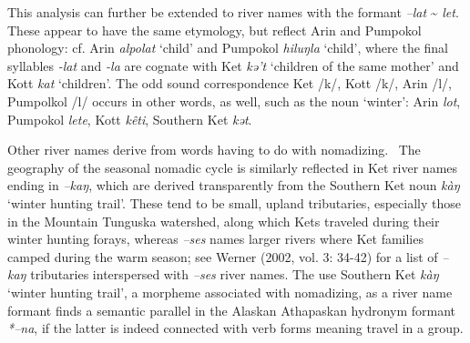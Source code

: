 This analysis can further be extended to river names with the formant \textit{–lat }\~{} \textit{let}. These appear to have the same etymology, but reflect Arin and Pumpokol phonology: cf. Arin \textit{alpolat} ‘child’ and Pumpokol \textit{hiluŋla} ‘child’, where the final syllables \textit{{}-lat} and \textit{{}-la} are cognate with Ket \textit{kə’t} ‘children of the same mother’ and Kott \textit{kat} ‘children’. The odd sound correspondence Ket /k/, Kott /k/, Arin /l/, Pumpolkol /l/ occurs in other words, as well, such as the noun ‘winter’: Arin \textit{lot}, Pumpokol \textit{lete}, Kott \textit{kêti}, Southern Ket \textit{kət}.

Other river names derive from words having to do with nomadizing. \ The geography of the seasonal nomadic cycle is similarly reflected in Ket river names ending in \textit{–kaŋ}, which are derived transparently from the Southern Ket noun \textit{kàŋ }‘winter hunting trail’. These tend to be small, upland tributaries, especially those in the Mountain Tunguska watershed, along which Kets traveled during their winter hunting forays, whereas \textit{–ses} names larger rivers where Ket families camped during the warm season; see Werner (2002, vol. 3: 34-42) for a list of \textit{–kaŋ} tributaries interspersed with \textit{–ses} river names. The use Southern Ket \textit{kàŋ }‘winter hunting trail’, a morpheme associated with nomadizing, as a river name formant finds a semantic parallel in the Alaskan Athapaskan hydronym formant \textit{*–na}, if the latter is indeed connected with verb forms meaning travel in a group.


